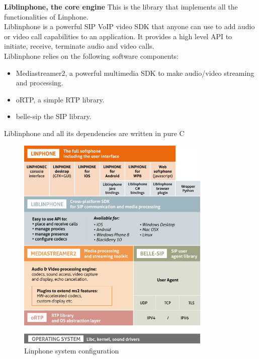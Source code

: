 \documentclass[11pt]{article}
\begin{document}
\textbf{Liblinphone, the core engine} \newline\newline
This is the library that implements all the functionalities of Linphone. \\
Liblinphone is a powerful SIP VoIP video SDK that anyone can use to add audio or video call capabilities to an application. It provides a high level API to initiate, receive, terminate audio and video calls.\\
\newline Liblinphone relies on the following software components:
\begin{itemize}
\item Mediastreamer2, a powerful multimedia SDK to make audio/video streaming and processing.
\item oRTP, a simple RTP library.
\item belle-sip the SIP library.
\end{itemize}
Liblinphone and all its dependencies are written in pure C\\
\begin{figure}[H]
\includegraphics[width=350px]{./images/schema-linphone.png}
\caption{Linphone system configuration}
\label{Configuration}
\end{figure}
\newpage
\end{document}
